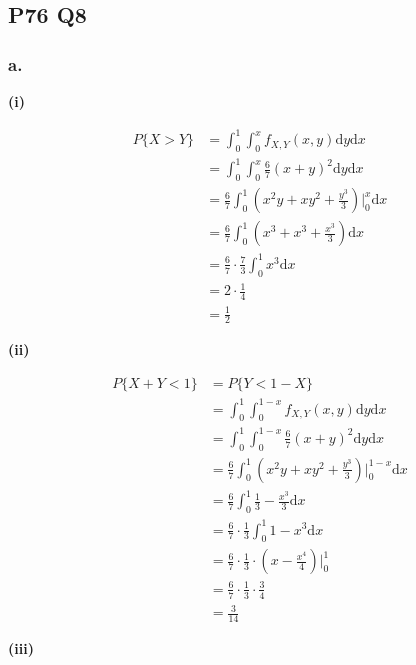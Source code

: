 \documentclass[a4paper,12pt]{ctexart}
\begin{document}
\newpage
\subsection*{P76 Q8}

\subsubsection*{a.}

\textbf{(i)}

\begin{align*}
	P\{X > Y\} &= \int_0^1 \int_0^x f_{X,Y}(x,y) \mathrm{d}y \mathrm{d}x \\
	&= \int_0^1 \int_0^x \frac{6}{7} (x + y)^2 \mathrm{d}y \mathrm{d}x \\
	&= \frac{6}{7} \int_0^1 \left( x^2y + xy^2 + \frac{y^3}{3} \right) \Big|_0^x \mathrm{d}x \\
	&= \frac{6}{7} \int_0^1 \left( x^3 + x^3 + \frac{x^3}{3} \right) \mathrm{d}x \\
	&= \frac{6}{7} \cdot \frac{7}{3} \int_0^1 x^3 \mathrm{d}x \\
	&= 2 \cdot \frac{1}{4} \\
	&= \frac{1}{2}
\end{align*}

\textbf{(ii)}

\begin{align*}
	P\{X + Y < 1\} &= P\{Y < 1 - X\} \\
	&= \int_0^1 \int_0^{1-x} f_{X,Y}(x,y) \mathrm{d}y \mathrm{d}x \\
	&= \int_0^1 \int_0^{1-x} \frac{6}{7} (x + y)^2 \mathrm{d}y \mathrm{d}x \\
	&= \frac{6}{7} \int_0^1 \left( x^2y + xy^2 + \frac{y^3}{3} \right) \Big|_0^{1-x} \mathrm{d}x \\
	&= \frac{6}{7} \int_0^1 \frac{1}{3} - \frac{x^3}{3} \mathrm{d}x \\
	&= \frac{6}{7} \cdot \frac{1}{3} \int_0^1 1 - x^3 \mathrm{d}x \\
	&= \frac{6}{7} \cdot \frac{1}{3} \cdot \left( x - \frac{x^4}{4} \right) \Big|_0^1 \\
	&= \frac{6}{7} \cdot \frac{1}{3} \cdot \frac{3}{4} \\
	&= \frac{3}{14}
\end{align*}

\textbf{(iii)}
\end{document}
